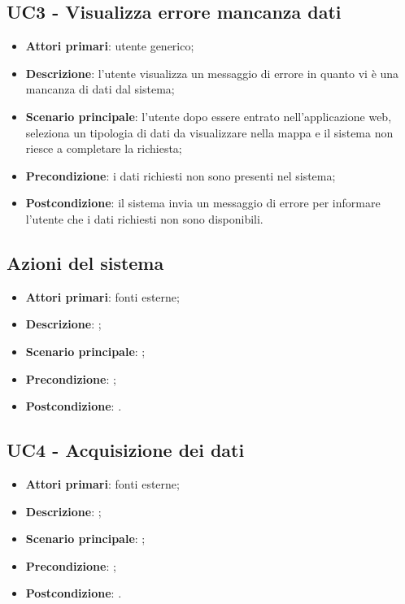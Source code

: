 \subsection{UC3 - Visualizza errore mancanza dati}
\begin{itemize}
	\item \textbf{Attori primari}: utente generico;
	\item \textbf{Descrizione}: l'utente visualizza un messaggio di errore in quanto vi è una mancanza di dati dal sistema;
	\item \textbf{Scenario principale}: l'utente dopo essere entrato nell'applicazione web, seleziona un tipologia di dati da visualizzare nella mappa e il sistema non riesce a completare la richiesta;
	\item \textbf{Precondizione}: i dati richiesti non sono presenti nel sistema;
	\item \textbf{Postcondizione}: il sistema invia un messaggio di errore per informare l'utente che i dati richiesti non sono disponibili.
\end{itemize}

\subsection{Azioni del sistema}
\begin{itemize}
\item \textbf{Attori primari}: fonti esterne;
\item \textbf{Descrizione}: ;
\item \textbf{Scenario principale}: ;
\item \textbf{Precondizione}: ;
\item \textbf{Postcondizione}: .
\end{itemize}

\subsection{UC4 - Acquisizione dei dati}
\begin{itemize}
\item \textbf{Attori primari}: fonti esterne;
\item \textbf{Descrizione}: ;
\item \textbf{Scenario principale}: ;
\item \textbf{Precondizione}: ;
\item \textbf{Postcondizione}: .
\end{itemize}

